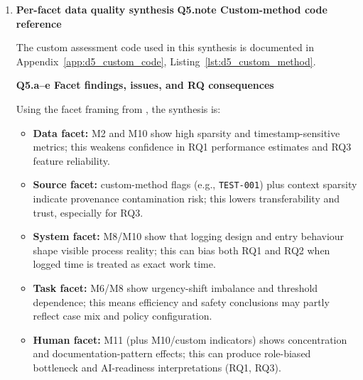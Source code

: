 \begin{enumerate}
\textbf{Q4.c Custom DQ assessment code}
\par
The full implementation is provided in Appendix~\ref{app:d5_custom_code}, Listing~\ref{lst:d5_custom_method}.

\textbf{Q4.d RQ impact and mechanism}\par
Summary results (Appendix~\ref{app:d5_custom_dimension}, Table~\ref{tab:d5_custom_summary}) show 1 high-risk flagged case out of 17 (5.88\%). Even this small share affects all RQs:
\begin{itemize}
  \item \textbf{RQ1:} can distort apparent workflow timing and throughput metrics.
  \item \textbf{RQ2:} can alter conformance denominators and bias pass/fail interpretation.
  \item \textbf{RQ3:} can contaminate model-development data and reduce validity.
\end{itemize}

\textbf{Q4.e Facet-mapping table reference}\par
Facet mapping is included in Appendix~\ref{app:d5_custom_dimension}, Table~\ref{tab:d5_custom_facet_mapping}.

\item \textbf{Per-facet data quality synthesis}
\textbf{Q5.note Custom-method code reference}\par
The custom assessment code used in this synthesis is documented in Appendix~\ref{app:d5_custom_code}, Listing~\ref{lst:d5_custom_method}.

\textbf{Q5.a--e Facet findings, issues, and RQ consequences}\par
Using the facet framing from \textcite{mohammed2025fivefacets}, the synthesis is:
\begin{itemize}
  \item \textbf{Data facet:} M2 and M10 show high sparsity and timestamp-sensitive metrics; this weakens confidence in RQ1 performance estimates and RQ3 feature reliability.
  \item \textbf{Source facet:} custom-method flags (e.g., \texttt{TEST-001}) plus context sparsity indicate provenance contamination risk; this lowers transferability and trust, especially for RQ3.
  \item \textbf{System facet:} M8/M10 show that logging design and entry behaviour shape visible process reality; this can bias both RQ1 and RQ2 when logged time is treated as exact work time.
  \item \textbf{Task facet:} M6/M8 show urgency-shift imbalance and threshold dependence; this means efficiency and safety conclusions may partly reflect case mix and policy configuration.
  \item \textbf{Human facet:} M11 (plus M10/custom indicators) shows concentration and documentation-pattern effects; this can produce role-biased bottleneck and AI-readiness interpretations (RQ1, RQ3).
\end{itemize}


\end{enumerate}
